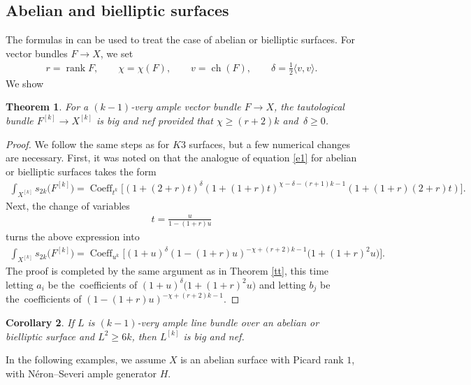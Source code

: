 \documentclass[pdftex]{sigma}
\numberwithin{equation}{section}
\newtheorem{Theorem}{Theorem}[section]
\newtheorem{Corollary}[Theorem]{Corollary}
\begin{document}
\subsection{Abelian and bielliptic surfaces}\label{ababab}
The formulas in \cite{MOP} can be used to treat the case of abelian or bielliptic surfaces. For vector bundles $F\to X$, we set\vspace{-.5ex}
\begin{gather*}
r=\operatorname{rank}F,\qquad \chi=\chi(F),\qquad v=\operatorname{ch}(F), \qquad \delta=\frac{1}{2}\langle v, v\rangle.
\end{gather*}
We show
\begin{Theorem}
For a $(k-1)$-very ample vector bundle $F\to X$,
the tautological bundle $F^{[k]}\to X^{[k]}$ is big and nef provided that
$\chi\geq (r+2)k$ and~$\delta\geq 0$.
\end{Theorem}

\begin{proof}
We follow the same steps as for $K3$ surfaces, but a few numerical changes are necessary. First, it was noted on \cite[p.~19]{MOP} that the analogue of equation \eqref{e1} for abelian or bielliptic surfaces takes the form
\begin{gather*}
\int_{X^{[k]}} s_{2k} \big(F^{[k]}\big)= \operatorname{Coeff}_{t^k}
\bigl[(1+ (2+r)t)^{\delta} (1+(1+r)t)^{\chi-\delta -(r+1)k-1} (1+(1+r)(2+r)t)\bigr].
\end{gather*}
Next, the change of variables
\begin{gather*}
t=\frac{u}{1-(1+r)u}
\end{gather*}
turns the above expression into
\begin{gather*}
\int_{X^{[k]}} s_{2k} \big(F^{[k]}\big)=\operatorname{Coeff}_{u^k}
\bigl[(1+u)^{\delta} (1-(1+r)u)^{-\chi+(r+2)k-1} \big(1+(1+r)^2u\big)\bigr].
\end{gather*}
The proof is completed by the same argument as in Theorem \ref{tt}, this time letting $a_i$ be the~coefficients of $(1+u)^{\delta}\big(1+(1+r)^2u\big)$ and letting $b_j$ be the~coefficients of $(1-(1+r)u)^{-\chi+(r+2)k-1}$.
\end{proof}

\begin{Corollary}\label{c10}
If $L$ is $(k-1)$-very ample line bundle over an abelian or bielliptic surface and $L^2\geq 6k$, then $L^{[k]}$ is big and nef.
\end{Corollary}

In the following examples, we assume $X$ is an abelian surface with Picard rank $1$, with N\'eron--Severi ample generator $H$.
\end{document}

